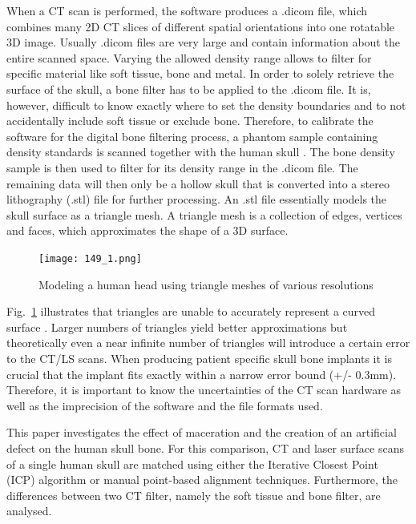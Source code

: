 \documentclass[a4paper]{article}
\begin{document}
When a CT scan is performed, the software produces a {\selectfont .dicom} file, which combines many 2D CT slices of different spatial orientations into one rotatable 3D image. Usually {\selectfont .dicom} files are very large and contain information about the entire scanned space. Varying the allowed density range allows to filter for specific material like soft tissue, bone and metal. In order to solely retrieve the surface of the skull, a bone filter has to be applied to the {\selectfont .dicom} file. It is, however, difficult to know exactly where to set the density boundaries and to not accidentally include soft tissue or exclude bone. Therefore, to calibrate the software for the digital bone filtering process, a phantom sample containing density standards is scanned together with the human skull \citep{arnold1990automated,arnold1991calibration}. The bone density sample is then used to filter for its density range in the {\selectfont .dicom} file. The remaining data will then only be a hollow skull that is converted into a stereo lithography ({\selectfont .stl}) file for further processing. An {\selectfont .stl} file essentially models the skull surface as a triangle mesh. A triangle mesh is a collection of edges, vertices and faces, which approximates the shape of a 3D surface. 

\begin{figure}[!ht]
		\centering
			\texttt{[image: 149\_1.png]}
\caption{\label{fig:triangle_mesh}Modeling a human head using triangle meshes of various resolutions \citep*{aachen_figure}}
\end{figure}


Fig.~\ref{fig:triangle_mesh} illustrates that triangles are unable to accurately represent a curved surface \citep{accurate}. Larger numbers of triangles yield better approximations but theoretically even a near infinite number of triangles will introduce a certain error to the CT/LS scans. When producing patient specific skull bone implants it is crucial that the implant fits exactly within a narrow error bound (+/- 0.3mm). Therefore, it is important to know the uncertainties of the CT scan hardware as well as the imprecision of the software and the file formats used.

This paper investigates the effect of maceration and the creation of an artificial defect on the human skull bone. For this comparison, CT and laser surface scans of a single human skull are matched using either the Iterative Closest Point (ICP) algorithm or manual point-based alignment techniques. Furthermore, the differences between two CT filter, namely the soft tissue and bone filter, are analysed.
\newpage
\end{document}
